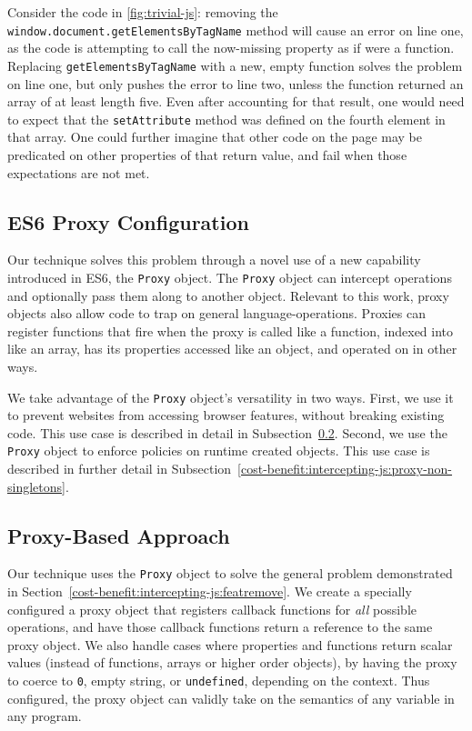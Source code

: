 

Consider the code in \ref{fig:trivial-js}:  removing the
\texttt{window.document.getElementsByTagName} method will cause an error
on line one, as the code is attempting to call the now-missing property as if
were a function.  Replacing \texttt{getElementsByTagName} with a new, empty
function solves the problem on line one, but only pushes the error to line
two, unless the function returned an array of at least length five. Even after
accounting for that result, one would need to expect that the
\texttt{setAttribute} method was defined on the fourth element in that array.
One could further imagine that other code on the page may be predicated on
other properties of that return value, and fail when those expectations are not
met.


\subsection{ES6 Proxy Configuration}
Our technique solves this problem through a novel use of a new capability
introduced in ES6, the \texttt{Proxy} object.  The \texttt{Proxy} object can
intercept operations and optionally pass them along to another object.
Relevant to this work, proxy objects also allow code to trap on general
language-operations.  Proxies can register functions that fire when the
proxy is called like a function, indexed into like an array, has its properties
accessed like an object, and operated on in other ways.

We take advantage of the \texttt{Proxy} object's versatility in two ways.
First, we use it to prevent websites from accessing browser features,
without breaking existing code.  This use case is described in detail in
Subsection~\ref{cost-benefit:intercepting-js:proxy-general}.  Second, we
use the \texttt{Proxy} object to enforce policies on runtime created objects.
This use case is described in further detail in
Subsection~\ref{cost-benefit:intercepting-js:proxy-non-singletons}.


\subsection{Proxy-Based Approach}
\label{cost-benefit:intercepting-js:proxy-general}

Our technique uses the \texttt{Proxy} object to solve the general problem
demonstrated in Section~\ref{cost-benefit:intercepting-js:featremove}.  We
create a specially configured a proxy object that registers callback functions
for \emph{all} possible \JS operations, and have those callback functions
return a reference to the same proxy object.  We also handle cases where \WAPI
properties and functions return scalar values (instead of functions, arrays
or higher order objects), by having the proxy to coerce to \texttt{0},
empty string, or \texttt{undefined}, depending on the context. Thus configured,
the proxy object can validly take on the semantics of any variable in any \JS
program.

